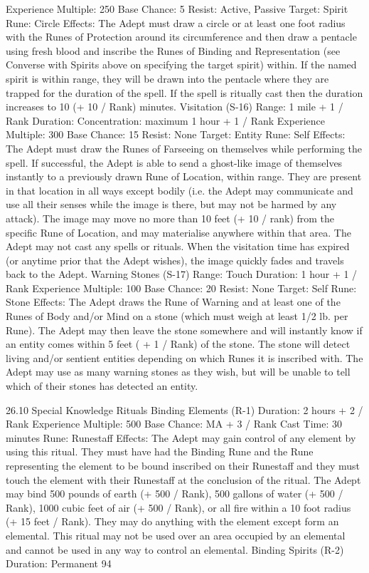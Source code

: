 \documentclass[a4paper]{article}
\begin{document}
\begin{multicols}{3}
Experience Multiple: 250
Base Chance: 5%
Resist: Active, Passive
Target: Spirit
Rune: Circle
Effects: The Adept must draw a circle or at least
one foot radius with the Runes of Protection
around its circumference and then draw a pentacle
using fresh blood and inscribe the Runes of Binding and Representation (see Converse with Spirits
above on specifying the target spirit) within. If the
named spirit is within range, they will be drawn
into the pentacle where they are trapped for the
duration of the spell.
If the spell is ritually cast then the duration increases to 10 (+ 10 / Rank) minutes.
Visitation (S-16)
Range: 1 mile + 1 / Rank
Duration: Concentration: maximum 1 hour + 1 /
Rank
Experience Multiple: 300
Base Chance: 15%
Resist: None
Target: Entity
Rune: Self
Effects: The Adept must draw the Runes of Farseeing on themselves while performing the spell. If
successful, the Adept is able to send a ghost-like
image of themselves instantly to a previously
drawn Rune of Location, within range. They are
present in that location in all ways except bodily
(i.e. the Adept may communicate and use all their
senses while the image is there, but may not be
harmed by any attack). The image may move no
more than 10 feet (+ 10 / rank) from the specific
Rune of Location, and may materialise anywhere
within that area. The Adept may not cast any spells
or rituals. When the visitation time has expired (or
anytime prior that the Adept wishes), the image
quickly fades and travels back to the Adept.
Warning Stones (S-17)
Range: Touch
Duration: 1 hour + 1 / Rank
Experience Multiple: 100
Base Chance: 20%
Resist: None
Target: Self
Rune: Stone
Effects: The Adept draws the Rune of Warning and
at least one of the Runes of Body and/or Mind on a
stone (which must weigh at least 1/2 lb. per Rune).
The Adept may then leave the stone somewhere
and will instantly know if an entity comes within 5
feet ( + 1 / Rank) of the stone. The stone will detect
living and/or sentient entities depending on which
Runes it is inscribed with. The Adept may use as
many warning stones as they wish, but will be
unable to tell which of their stones has detected an
entity.

26.10 Special Knowledge Rituals
Binding Elements (R-1)
Duration: 2 hours + 2 / Rank
Experience Multiple: 500
Base Chance: MA + 3 / Rank
Cast Time: 30 minutes
Rune: Runestaff
Effects: The Adept may gain control of any element by using this ritual. They must have had the
Binding Rune and the Rune representing the element to be bound inscribed on their Runestaff and
they must touch the element with their Runestaff at
the conclusion of the ritual. The Adept may bind
500 pounds of earth (+ 500 / Rank), 500 gallons of
water (+ 500 / Rank), 1000 cubic feet of air (+ 500
/ Rank), or all fire within a 10 foot radius (+ 15 feet
/ Rank). They may do anything with the element
except form an elemental. This ritual may not be
used over an area occupied by an elemental and
cannot be used in any way to control an elemental.
Binding Spirits (R-2)
Duration: Permanent
94


\end{multicols}
\end{document}
